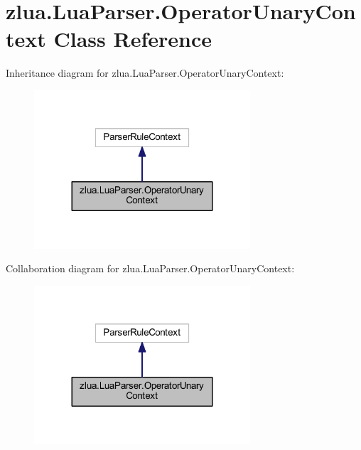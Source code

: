 \hypertarget{classzlua_1_1_lua_parser_1_1_operator_unary_context}{}\section{zlua.\+Lua\+Parser.\+Operator\+Unary\+Context Class Reference}
\label{classzlua_1_1_lua_parser_1_1_operator_unary_context}


Inheritance diagram for zlua.\+Lua\+Parser.\+Operator\+Unary\+Context\+:
\nopagebreak
\begin{figure}[H]
\begin{center}
\leavevmode
\includegraphics[width=228pt]{classzlua_1_1_lua_parser_1_1_operator_unary_context__inherit__graph}
\end{center}
\end{figure}


Collaboration diagram for zlua.\+Lua\+Parser.\+Operator\+Unary\+Context\+:
\nopagebreak
\begin{figure}[H]
\begin{center}
\leavevmode
\includegraphics[width=228pt]{classzlua_1_1_lua_parser_1_1_operator_unary_context__coll__graph}
\end{center}
\end{figure}
